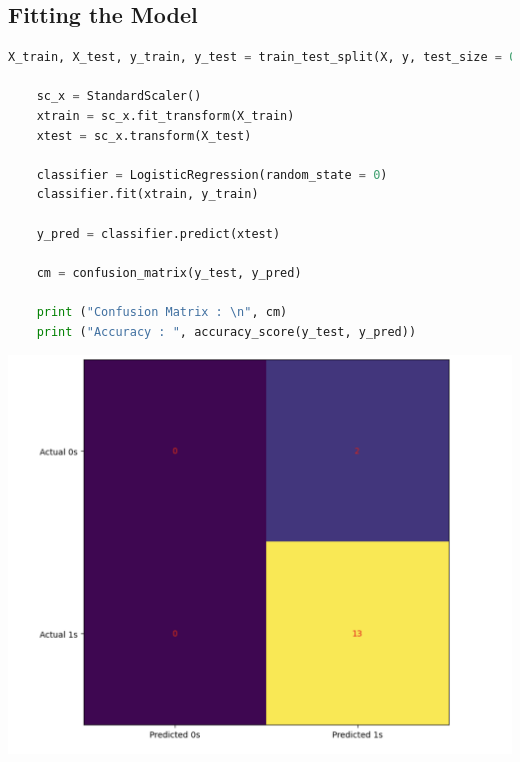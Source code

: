 \documentclass{article}
\begin{document}
\subsection{Fitting the Model}
\begin{lstlisting}[language=Python]
	X_train, X_test, y_train, y_test = train_test_split(X, y, test_size = 0.25, random_state = 0)
	
	sc_x = StandardScaler()
	xtrain = sc_x.fit_transform(X_train)
	xtest = sc_x.transform(X_test)
	
	classifier = LogisticRegression(random_state = 0)
	classifier.fit(xtrain, y_train)
	
	y_pred = classifier.predict(xtest)
	
	cm = confusion_matrix(y_test, y_pred)
	
	print ("Confusion Matrix : \n", cm)
	print ("Accuracy : ", accuracy_score(y_test, y_pred))
\end{lstlisting}
\includegraphics[scale=0.32]{images/8.png}
\end{document}
